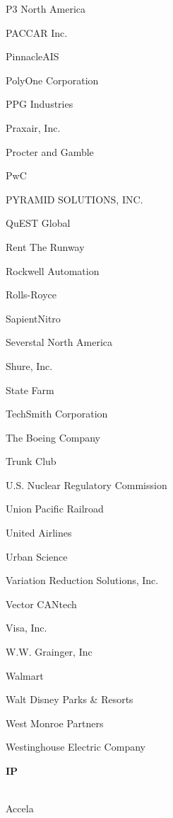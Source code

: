 \documentclass[twoside]{article}
\begin{document}
\begin{center}
\begin{multicols}{5}
\begin{FlushLeft}
\begin{compactitem}
\item P3 North America
\item PACCAR Inc.
\item PinnacleAIS
\item PolyOne Corporation
\item PPG Industries
\item Praxair, Inc.
\item Procter and Gamble
\item PwC
\item PYRAMID SOLUTIONS, INC.
\item QuEST Global
\item Rent The Runway
\item Rockwell Automation
\item Rolls-Royce
\item SapientNitro
\item Severstal North America
\item Shure, Inc.
\item State Farm
\item TechSmith Corporation
\item The Boeing Company
\item Trunk Club
\item U.S. Nuclear Regulatory Commission
\item Union Pacific Railroad
\item United Airlines
\item Urban Science
\item Variation Reduction Solutions, Inc.
\item Vector CANtech
\item Visa, Inc.
\item W.W. Grainger, Inc
\item Walmart
\item Walt Disney Parks \& Resorts
\item West Monroe Partners
\item Westinghouse Electric Company
\end{compactitem}
        \end{FlushLeft}
        \vspace{1em}
        {\fontsize{14}{16}\selectfont \bf IP}\\
        \vspace{-1em}
        ~\hrulefill~
        \vspace{-.9em}
        \begin{FlushLeft}
        \begin{compactitem}
        \item Accela

\end{compactitem}
\end{FlushLeft}
\end{multicols}
\end{center}
\end{document}
